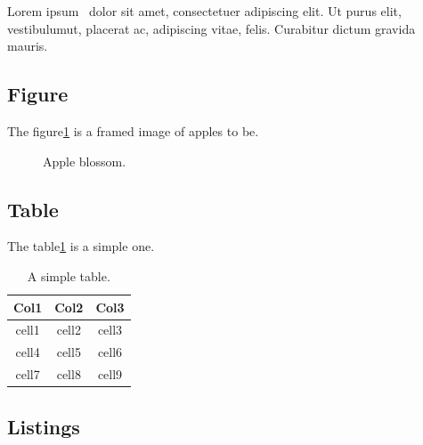Lorem ipsum~\cite{loremlipsum} dolor sit amet, consectetuer adipiscing elit. Ut purus elit, vestibulumut, placerat ac, adipiscing vitae, felis. Curabitur dictum gravida mauris. 

\subsection{Figure}

The figure\ref{fig:appleblossom1} is a framed image of apples to be.

\begin{figure}[ht!]
    \caption{Apple blossom.}\label{fig:appleblossom1}
\end{figure}

\subsection{Table}

The table\ref{table:simpletable} is a simple one.

\begin{table}[ht!]
    \begin{tabular}{ |c|c|c| } %
        \hline                 %
        Col1 & Col2 & Col3 \\
        \hline                 %
        cell1 & cell2 & cell3 \\ 
        cell4 & cell5 & cell6 \\ 
        cell7 & cell8 & cell9 \\ 
        \hline                 %
    \end{tabular}
    \caption{A simple table.}\label{table:simpletable}
\end{table}

\subsection{Listings}

